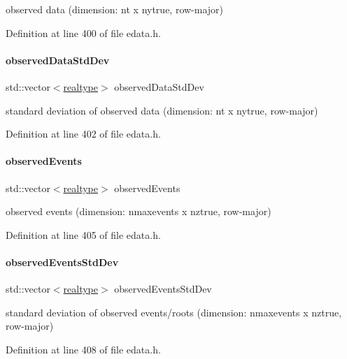 observed data (dimension\+: nt x nytrue, row-\/major) 

Definition at line 400 of file edata.\+h.

\mbox{\label{classamici_1_1_exp_data_aa097568cebb4be48c4c1dfaab0c2a159}} 
\paragraph{\texorpdfstring{observedDataStdDev}{observedDataStdDev}}
{\footnotesize\ttfamily std\+::vector$<$\mbox{\hyperlink{namespaceamici_a1bdce28051d6a53868f7ccbf5f2c14a3}{realtype}}$>$ observed\+Data\+Std\+Dev\hspace{0.3cm}{\ttfamily [protected]}}

standard deviation of observed data (dimension\+: nt x nytrue, row-\/major) 

Definition at line 402 of file edata.\+h.

\mbox{\label{classamici_1_1_exp_data_a629e6085839e16bac95ef0eba580f7f0}} 
\paragraph{\texorpdfstring{observedEvents}{observedEvents}}
{\footnotesize\ttfamily std\+::vector$<$\mbox{\hyperlink{namespaceamici_a1bdce28051d6a53868f7ccbf5f2c14a3}{realtype}}$>$ observed\+Events\hspace{0.3cm}{\ttfamily [protected]}}

observed events (dimension\+: nmaxevents x nztrue, row-\/major) 

Definition at line 405 of file edata.\+h.

\mbox{\label{classamici_1_1_exp_data_abb12a8f75b4e6c936ae6c0be770628c9}} 
\paragraph{\texorpdfstring{observedEventsStdDev}{observedEventsStdDev}}
{\footnotesize\ttfamily std\+::vector$<$\mbox{\hyperlink{namespaceamici_a1bdce28051d6a53868f7ccbf5f2c14a3}{realtype}}$>$ observed\+Events\+Std\+Dev\hspace{0.3cm}{\ttfamily [protected]}}

standard deviation of observed events/roots (dimension\+: nmaxevents x nztrue, row-\/major) 

Definition at line 408 of file edata.\+h.

